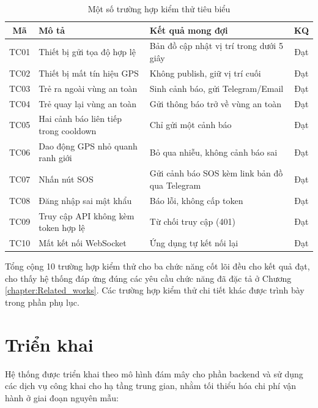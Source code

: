 \documentclass[../DoAn.tex]{subfiles}
\begin{document}
\begin{table}[H]
\centering
\caption{Một số trường hợp kiểm thử tiêu biểu}
\label{table:kiemthu}
\begin{tabular}{|c|p{4.2cm}|p{4.2cm}|c|}
\hline
\textbf{Mã} & \textbf{Mô tả} & \textbf{Kết quả mong đợi} & \textbf{KQ} \\ \hline
TC01 & Thiết bị gửi tọa độ hợp lệ & Bản đồ cập nhật vị trí trong dưới 5 giây & Đạt \\ \hline
TC02 & Thiết bị mất tín hiệu GPS & Không publish, giữ vị trí cuối & Đạt \\ \hline
TC03 & Trẻ ra ngoài vùng an toàn & Sinh cảnh báo, gửi Telegram/Email & Đạt \\ \hline
TC04 & Trẻ quay lại vùng an toàn & Gửi thông báo trở về vùng an toàn & Đạt \\ \hline
TC05 & Hai cảnh báo liên tiếp trong cooldown & Chỉ gửi một cảnh báo & Đạt \\ \hline
TC06 & Dao động GPS nhỏ quanh ranh giới & Bỏ qua nhiễu, không cảnh báo sai & Đạt \\ \hline
TC07 & Nhấn nút SOS & Gửi cảnh báo SOS kèm link bản đồ qua Telegram & Đạt \\ \hline
TC08 & Đăng nhập sai mật khẩu & Báo lỗi, không cấp token & Đạt \\ \hline
TC09 & Truy cập API không kèm token hợp lệ & Từ chối truy cập (401) & Đạt \\ \hline
TC10 & Mất kết nối WebSocket & Ứng dụng tự kết nối lại & Đạt \\ \hline
\end{tabular}
\end{table}

Tổng cộng 10 trường hợp kiểm thử cho ba chức năng cốt lõi đều cho kết quả đạt, cho thấy hệ thống đáp ứng đúng các yêu cầu chức năng đã đặc tả ở Chương \ref{chapter:Related_works}. Các trường hợp kiểm thử chi tiết khác được trình bày trong phần phụ lục.

\section{Triển khai}

Hệ thống được triển khai theo mô hình đám mây cho phần backend và sử dụng các dịch vụ công khai cho hạ tầng trung gian, nhằm tối thiểu hóa chi phí vận hành ở giai đoạn nguyên mẫu:
\end{document}
